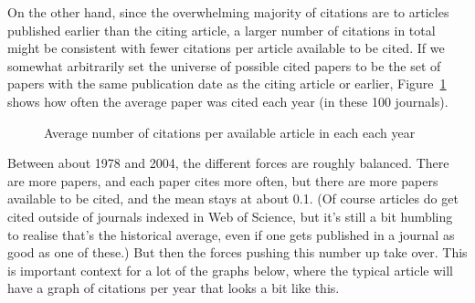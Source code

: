 \documentclass[
  10pt,
  letterpaper,
  DIV=11,
  numbers=noendperiod,
  twoside]{scrartcl}
\begin{document}
On the other hand, since the overwhelming majority of citations are to
articles published earlier than the citing article, a larger number of
citations in total might be consistent with fewer citations per article
available to be cited. If we somewhat arbitrarily set the universe of
possible cited papers to be the set of papers with the same publication
date as the citing article or earlier,
Figure~\ref{fig-average-of-citations-by-year} shows how often the
average paper was cited each year (in these 100 journals).

\begin{figure}


\caption{\label{fig-average-of-citations-by-year}Average number of
citations per available article in each each year}

\end{figure}%

Between about 1978 and 2004, the different forces are roughly balanced.
There are more papers, and each paper cites more often, but there are
more papers available to be cited, and the mean stays at about 0.1. (Of
course articles do get cited outside of journals indexed in Web of
Science, but it's still a bit humbling to realise that's the historical
average, even if one gets published in a journal as good as one of
these.) But then the forces pushing this number up take over. This is
important context for a lot of the graphs below, where the typical
article will have a graph of citations per year that looks a bit like
this.
\end{document}
